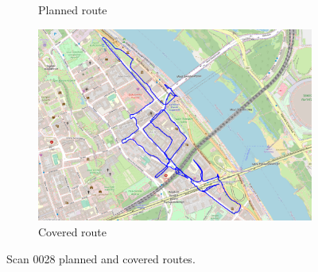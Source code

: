 \documentclass[a4paper,12pt]{book}
\begin{document}
\begin{enumerate}
\begin{figure}[H]
\begin{subfigure}{.95\textwidth}
			\caption{Planned route}
			\label{fig:a28}
		\end{subfigure}%
		\linebreak
		\begin{subfigure}{.95\textwidth}
			\centering
			\includegraphics[width=1\linewidth]{route_c28}
			\caption{Covered route}
			\label{fig:b28}
		\end{subfigure}
		\caption{Scan 0028 planned and covered routes.}
		\label{fig:fig28}
	\end{figure}
\end{enumerate}
\end{document}
